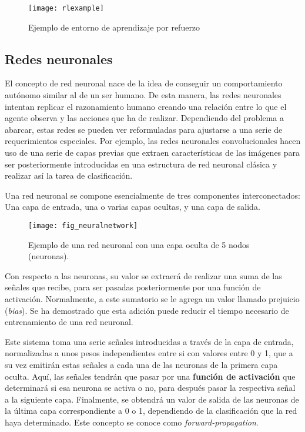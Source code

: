 \documentclass[11pt,spanish,listoffigures,listoftables]{tfgetsinf}
\begin{document}
\begin{figure}[h]
	\centering
	\texttt{[image: rlexample]}
	\caption{Ejemplo de entorno de aprendizaje por refuerzo}
\end{figure}


\subsection{Redes neuronales}

El concepto de red neuronal nace de la idea de conseguir un comportamiento autónomo similar al de un ser humano. De esta manera, las redes neuronales intentan replicar el razonamiento humano creando una relación entre lo que el agente observa y las acciones que ha de realizar. Dependiendo del problema a abarcar, estas redes se pueden ver reformuladas para ajustarse a una serie de requerimientos especiales. Por ejemplo, las redes neuronales convolucionales hacen uso de una serie de capas previas que extraen características de las imágenes para ser posteriormente introducidas en una estructura de red neuronal clásica y realizar así la tarea de clasificación.

Una red neuronal se compone esencialmente de tres componentes interconectados: Una capa de entrada, una o varias capas ocultas, y una capa de salida.

\begin{figure}[h]
	\centering
	\texttt{[image: fig\_neuralnetwork]}
	\caption{Ejemplo de una red neuronal con una capa oculta de 5 nodos (neuronas).}
	
\end{figure}

Con respecto a las neuronas, su valor se extraerá de realizar una suma de las señales que recibe, para ser pasadas posteriormente por una función de activación. Normalmente, a este sumatorio se le agrega un valor llamado prejuicio (\textit{bias}). Se ha demostrado que esta adición puede reducir el tiempo necesario de entrenamiento de una red neuronal.

Este sistema toma una serie señales introducidas a través de la capa de entrada, normalizadas a unos pesos independientes entre si con valores entre 0 y 1, que a su vez emitirán estas señales a cada una de las neuronas de la primera capa oculta. Aquí, las señales tendrán que pasar por una \textbf{función de activación} que determinará si esa neurona se activa o no, para después pasar la respectiva señal a la siguiente capa. Finalmente, se obtendrá un valor de salida de las neuronas de la última capa correspondiente a 0 o 1, dependiendo de la clasificación que la red haya determinado. Este concepto se conoce como \textit{forward-propagation}.
\end{document}
